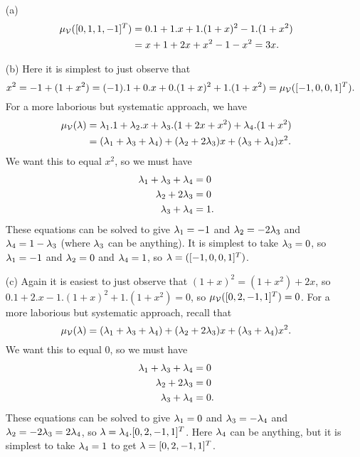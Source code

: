  \begin{itemize}
  \item[(a)]
   \begin{align*}
    \mu_{\mathcal{V}}([0,1,1,-1]^T)
     &= 0.1 + 1.x + 1.(1+x)^2 - 1.(1+x^2) \\
     &= x + 1 + 2x + x^2 - 1 - x^2 = 3x.
   \end{align*}
  \item[(b)] Here it is simplest to just observe that
   \[ x^2 =
       -1 + (1+x^2) = (-1). 1 + 0.x + 0.(1+x)^2 + 1.(1+x^2) =
       \mu_{\mathcal{V}}([-1,0,0,1]^T).
   \]
   For a more laborious but systematic approach, we have
   \begin{align*}
    \mu_{\mathcal{V}}(\mathbf{\lambda})
     &= \lambda_1.1 + \lambda_2.x + \lambda_3.(1+2x+x^2) + \lambda_4.(1+x^2) \\
     &= (\lambda_1+\lambda_3+\lambda_4) + (\lambda_2+2\lambda_3)x + (\lambda_3+\lambda_4)x^2.
   \end{align*}
   We want this to equal $x^2$, so we must have
   \begin{align*}
    \lambda_1 + \lambda_3 + \lambda_4 &= 0 \\
    \lambda_2 + 2\lambda_3 &= 0 \\
    \lambda_3 + \lambda_4 &= 1.
   \end{align*}
   These equations can be solved to give $\lambda_1=-1$ and
   $\lambda_2=-2\lambda_3$ and $\lambda_4=1-\lambda_3$ (where $\lambda_3$ can be
   anything).  It is simplest to take $\lambda_3=0$, so
   $\lambda_1=-1$ and $\lambda_2=0$ and $\lambda_4=1$, so
   $\mathbf{\lambda}=([-1,0,0,1]^T)$.
  \item[(c)] Again it is easiest to just observe that
   $(1+x)^2=(1+x^2)+2x$, so
   $0.1 + 2.x - 1.(1+x)^2 + 1.(1+x^2)=0$, so
   $\mu_{\mathcal{V}}([0,2,-1,1]^T)=0$.
   For a more laborious but systematic approach, recall that
   \[ \mu_{\mathcal{V}}(\mathbf{\lambda}) =
      (\lambda_1+\lambda_3+\lambda_4) + (\lambda_2+2\lambda_3)x + (\lambda_3+\lambda_4)x^2.
   \]
   We want this to equal $0$, so we must have
   \begin{align*}
    \lambda_1 + \lambda_3 + \lambda_4 &= 0 \\
    \lambda_2 + 2\lambda_3 &= 0 \\
    \lambda_3 + \lambda_4 &= 0.
   \end{align*}
   These equations can be solved to give $\lambda_1=0$ and
   $\lambda_3=-\lambda_4$ and $\lambda_2=-2\lambda_3=2\lambda_4$, so
   $\mathbf{\lambda}=\lambda_4.[0,2,-1,1]^T$.  Here $\lambda_4$ can be anything,
   but it is simplest to take $\lambda_4=1$ to get
   $\mathbf{\lambda}=[0,2,-1,1]^T$.
 \end{itemize}
\EndDeferredSolution

